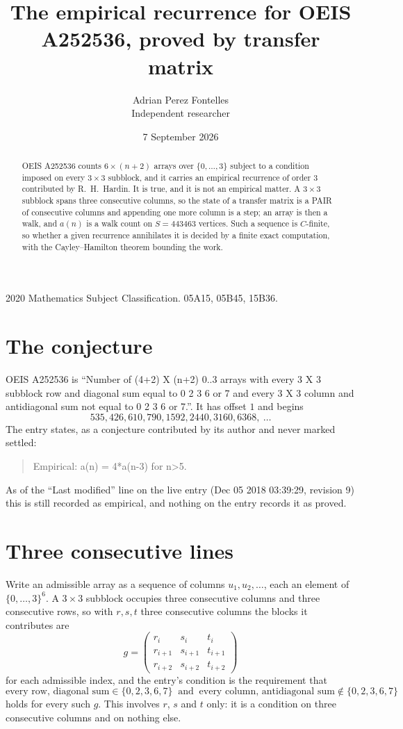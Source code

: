 \documentclass[11pt,a4paper]{article}
\title{The empirical recurrence for OEIS A252536, proved by transfer matrix}
\author{Adrian Perez Fontelles\\ \small Independent researcher}
\date{7 September 2026}
\theoremstyle{plain}
\theoremstyle{definition}
\begin{document}
\maketitle

\begin{abstract}
OEIS A252536 counts $6\times(n+2)$ arrays over $\{0,\dots,3\}$ subject to a condition imposed on
every $3\times3$ subblock, and it carries an empirical recurrence of order $3$
contributed by R.~H.~Hardin. It is true, and it is not an empirical matter. A $3\times3$
subblock spans three consecutive columns, so the state of a transfer matrix is a PAIR of
consecutive columns and appending one more column is a step; an array is then a walk, and
$a(n)$ is a walk count on $S=443463$ vertices. Such a sequence is $C$-finite, so whether a given
recurrence annihilates it is decided by a finite exact computation, with the Cayley--Hamilton
theorem bounding the work.
\end{abstract}

\noindent\small 2020 Mathematics Subject Classification. 05A15, 05B45, 15B36.\normalsize

\section{The conjecture}

OEIS A252536 is ``Number of (4+2) X (n+2) 0..3 arrays with every 3 X 3 subblock row and diagonal sum equal to 0 2 3 6 or 7 and every 3 X 3 column and antidiagonal sum not equal to 0 2 3 6 or 7.''. It has offset $1$ and begins
\[
535, 426, 610, 790, 1592, 2440, 3160, 6368,\ \dots
\]
The entry states, as a conjecture contributed by its author and never marked settled:
\begin{quote}
Empirical: a(n) = 4*a(n-3) for n>5.
\end{quote}
As of the ``Last modified'' line on the live entry (Dec 05 2018 03:39:29, revision 9) this is still
recorded as empirical, and nothing on the entry records it as proved.

\section{Three consecutive lines}

Write an admissible array as a sequence of columns $u_1,u_2,\dots$, each an element of
$\{0,\dots,3\}^{6}$. A $3\times3$ subblock occupies three consecutive columns and
three consecutive rows, so with $r,s,t$ three consecutive columns the blocks it
contributes are
\[
g=\begin{pmatrix}r_i&s_i&t_i\\ r_{i+1}&s_{i+1}&t_{i+1}\\ r_{i+2}&s_{i+2}&t_{i+2}\end{pmatrix}
\]
for each admissible index, and the entry's condition is the requirement that
\[
\text{every row, diagonal sum} \in \{0,2,3,6,7\}\ \text{ and }\ \text{every column, antidiagonal sum} \notin \{0,2,3,6,7\}
\]
holds for every such $g$. This involves $r$, $s$ and $t$ only: it is a condition on
three consecutive columns and on nothing else.
\end{document}
